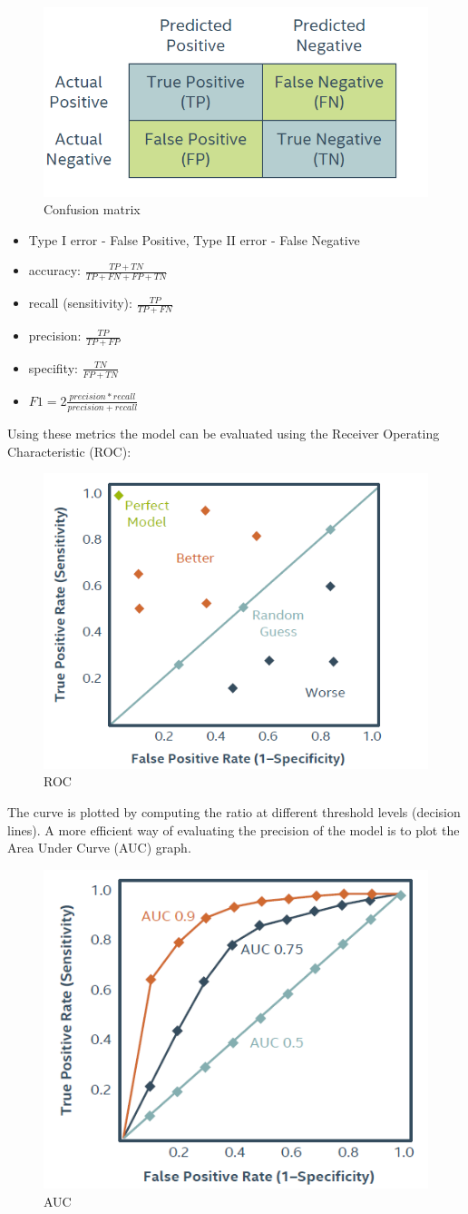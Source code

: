 \documentclass[11pt]{book}
\begin{document}
\begin{figure}[H]
    \centering
    \includegraphics[width=0.5\linewidth]{confusion.PNG}
    \caption{Confusion matrix}
    \label{fig:my_label}
\end{figure}

\begin{itemize}
    \item Type I error - False Positive, Type II error - False Negative
    \item accuracy: $\frac{TP +TN}{TP +FN +FP +TN}$
    \item recall (sensitivity): $\frac{TP}{TP+FN}$
    \item precision: $\frac{TP}{TP+FP}$
    \item specifity: $\frac{TN}{FP+TN}$
    \item $F1 = 2 \frac{precision*recall}{precision + recall}$
    
\end{itemize}

Using these metrics the model can be evaluated using the Receiver Operating Characteristic (ROC):

\begin{figure}[H]
    \centering
    \includegraphics[width=0.5\linewidth]{roc.PNG}
    \caption{ROC}
    \label{fig:my_label}
\end{figure}

The curve is plotted by computing the ratio at different threshold levels (decision lines). A more efficient way of evaluating the precision of the model is to plot the Area Under Curve (AUC) graph.

\begin{figure}[H]
    \centering
    \includegraphics[width=0.5\linewidth]{auc.PNG}
    \caption{AUC}
    \label{fig:my_label}
\end{figure}
\end{document}
